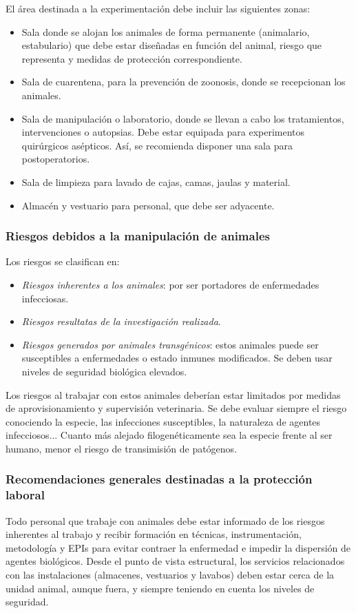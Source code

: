 El área destinada a la experimentación debe incluir las siguientes zonas:
\begin{itemize}[itemsep=0pt,parsep=0pt,topsep=0pt,partopsep=0pt]
    \item Sala donde se alojan los animales de forma permanente (animalario, estabulario) que debe estar diseñadas en función del animal, riesgo que representa y medidas de protección correspondiente.
    \item  Sala de cuarentena, para la prevención de zoonosis, donde se recepcionan los animales.
    \item Sala de manipulación o laboratorio, donde se llevan a cabo los tratamientos, intervenciones o autopsias. Debe estar equipada para experimentos quirúrgicos asépticos. Así, se recomienda disponer una sala para postoperatorios.
    \item Sala de limpieza para lavado de cajas, camas, jaulas y material.
    \item Almacén y vestuario para personal, que debe ser adyacente.
\end{itemize}
\subsubsection{Riesgos debidos a la manipulación de animales}
Los riesgos se clasifican en:
\begin{itemize}[itemsep=0pt,parsep=0pt,topsep=0pt,partopsep=0pt]
    \item \textit{Riesgos inherentes a los animales}: por ser portadores de enfermedades infecciosas.
    \item \textit{Riesgos resultatas de la investigación realizada}.
    \item \textit{Riesgos generados por animales transgénicos}: estos animales puede ser susceptibles a enfermedades o estado inmunes modificados. Se deben usar niveles de seguridad biológica elevados.
\end{itemize}

Los riesgos al trabajar con estos animales deberían estar limitados por medidas de aprovisionamiento y supervisión veterinaria. Se debe evaluar siempre el riesgo conociendo la especie, las infecciones susceptibles, la naturaleza de agentes infecciosos... Cuanto más alejado filogenéticamente sea la especie frente al ser humano, menor el riesgo de transimisión de patógenos.
\subsubsection{Recomendaciones generales destinadas a la protección laboral}
Todo personal que trabaje con animales debe estar informado de los riesgos inherentes al trabajo y recibir formación en técnicas, instrumentación, metodología y EPIs para evitar contraer la enfermedad e impedir la dispersión de agentes biológicos. Desde el punto de vista estructural, los servicios relacionados con las instalaciones (almacenes, vestuarios y lavabos) deben estar cerca de la unidad animal, aunque fuera, y siempre teniendo en cuenta los niveles de seguridad.


